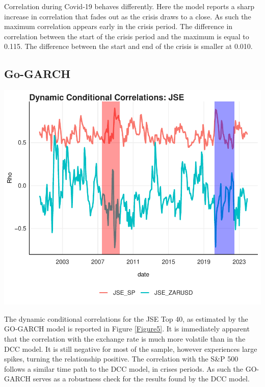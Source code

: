 \documentclass[11pt,preprint, authoryear]{elsarticle}
\let\origfigure\figure
\let\endorigfigure\endfigure
\renewenvironment{figure}[1][2] {
    \expandafter\origfigure\expandafter[H]
} {
    \endorigfigure
}
\numberwithin{equation}{section}
\numberwithin{figure}{section}
\numberwithin{table}{section}
\begin{document}
Correlation during Covid-19 behaves differently. Here the model reports
a sharp increase in correlation that fades out as the crisis draws to a
close. As such the maximum correlation appears early in the crisis
period. The difference in correlation between the start of the crisis
period and the maximum is equal to 0.115. The difference between the
start and end of the crisis is smaller at 0.010.

\hypertarget{go-garch-1}{%
\subsection{Go-GARCH}\label{go-garch-1}}

\begin{figure}[H]

{\centering \includegraphics{Template_files/figure-latex/Figure5-1} 

}

\caption{GO-GARCH \label{Figure5}}\label{fig:Figure5}
\end{figure}

The dynamic conditional correlations for the JSE Top 40, as estimated by
the GO-GARCH model is reported in Figure \ref{Figure5}. It is
immediately apparent that the correlation with the exchange rate is much
more volatile than in the DCC model. It is still negative for most of
the sample, however experiences large spikes, turning the relationship
positive. The correlation with the S\&P 500 follows a similar time path
to the DCC model, in crises periods. As such the GO-GARCH serves as a
robustness check for the results found by the DCC model.
\end{document}
